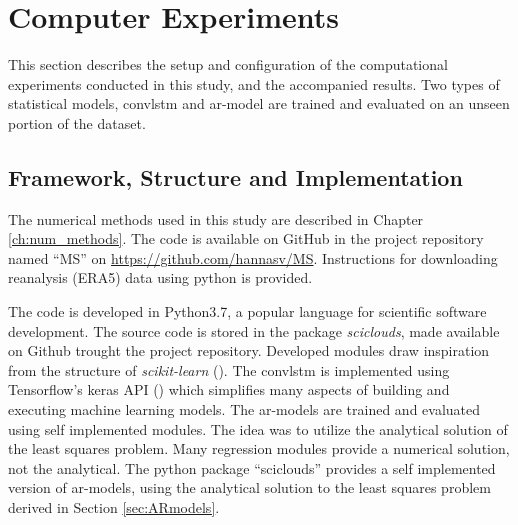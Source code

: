 \section{Computer Experiments} \label{ch:computer_experiments}
This section describes the setup and configuration of the computational experiments conducted in this study, and the accompanied results. Two types of statistical models, \acrshort{convlstm} and \acrshort{ar}-model are trained and evaluated on an unseen portion of the dataset. 

\subsection{Framework, Structure and Implementation} \label{sec:structure_and_implementations} \label{sec:framework}
The numerical methods used in this study are described in Chapter \ref{ch:num_methods}. The code is available on GitHub in the project repository named ``MS'' on \href{https://github.com/hannasv/MS}{https://github.com/hannasv/MS}. Instructions for downloading reanalysis (ERA5) data using python is provided.


The code is developed in Python3.7, a popular language for scientific software development. The source code is stored in the package \textit{sciclouds}, made available on Github trought the project repository. Developed modules draw inspiration from the structure of \textit{scikit-learn} (\cite{sklearn_api}).
The \acrshort{convlstm} is implemented using Tensorflow's keras API (\cite{tensorflow2015}) which simplifies many aspects of building and executing machine learning models. The \acrshort{ar}-models are trained and evaluated using self implemented modules. The idea was to utilize the analytical solution of the least squares problem. Many regression modules provide a numerical solution, not the analytical. The python package ``sciclouds'' provides a self implemented version of \acrshort{ar}-models, using the analytical solution to the least squares problem derived in Section \ref{sec:ARmodels}.

